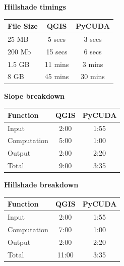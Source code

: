 \documentclass[journal]{IEEEtran}
\begin{document}
\vspace{.25in}
\pagebreak
\textbf{Hillshade timings}
\vspace{0.05in}

\begin{tabular}{ l | c | c }
    File Size & QGIS   & PyCUDA\\ \hline
    25 MB     & 5 secs & 3 secs\\ \hline
    200 Mb    & 15 secs & 6 secs\\ \hline
    1.5 GB    & 11 mins & 3 mins\\ \hline
    8 GB      & 45 mins & 30 mins
\end {tabular}

\vspace{.25in}
\textbf{Slope breakdown}
\vspace{0.05in}

\begin{tabular}{ l | c | c }
    Function    & QGIS & PyCUDA\\ \hline
    Input       & 2:00 & 1:55\\ \hline
    Computation & 5:00 & 1:00\\ \hline
    Output      & 2:00 & 2:20\\ \hline
    Total       & 9:00 & 3:35
\end {tabular}

\vspace{.25in}
\textbf{Hillshade breakdown}
\vspace{0.05in}

\begin{tabular}{ l | c | c }
    Function    & QGIS & PyCUDA\\ \hline
    Input       & 2:00 & 1:55\\ \hline
    Computation & 7:00 & 1:00\\ \hline
    Output      & 2:00 & 2:20\\ \hline
    Total       & 11:00 & 3:35
\end {tabular}
\vspace{0.25in}
\end{document}
